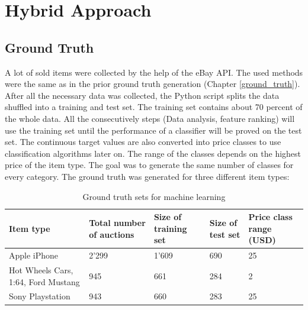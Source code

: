 \section{Hybrid Approach}

\subsection{Ground Truth}
A lot of sold items were collected by the help of the eBay API. The used methods were the same as in the prior ground truth generation (Chapter \ref{ground_truth}). After all the necessary data was collected, the Python script splits the data shuffled into a training and test set. The training set contains about 70 percent of the whole data. All the consecutively steps (Data analysis, feature ranking) will use the training set until the performance of a classifier will be proved on the test set. The continuous target values are also converted into price classes to use classification algorithms later on. The range of the classes depends on the highest price of the item type. The goal was to generate the same number of classes for every category. The ground truth was generated for three different item types:
\begin{table}[h!]
	\begin{center}
	\begin{tabular}{| p{2.6cm} | p{2.6cm} | p{2.6cm} | p{2.6cm} | p{2.6cm} |}
		\hline
		\textbf{Item type} & \textbf{Total number of auctions} & \textbf{Size of training set} & \textbf{Size of test set} & \textbf{Price class range (USD)} \\
		\hline
		Apple iPhone & 2'299 & 1'609 & 690 & 25 \\
		\hline
		Hot Wheels Cars, 1:64, Ford Mustang & 945 & 661 & 284 & 2 \\
		\hline
		Sony Playstation & 943 & 660 & 283 & 25 \\
		\hline
	\end{tabular}
	\end{center}
	\caption{Ground truth sets for machine learning}
\end{table}
